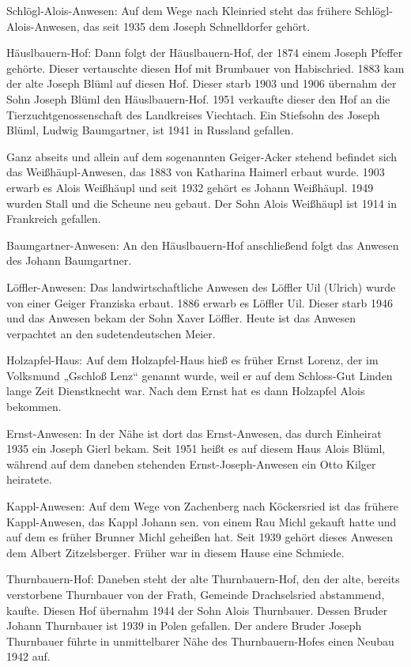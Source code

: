 \documentclass{book}
\begin{document}
Schlögl-Alois-Anwesen: Auf dem Wege nach Kleinried steht das frühere
Schlögl-Alois-Anwesen, das seit 1935 dem Joseph Schnelldorfer gehört.

Häuslbauern-Hof: Dann folgt der Häuslbauern-Hof, der 1874 einem Joseph Pfeffer
gehörte. Dieser vertauschte diesen Hof mit Brumbauer von Habischried. 1883 kam
der alte Joseph Blüml auf diesen Hof. Dieser starb 1903 und 1906 übernahm der
Sohn Joseph Blüml den Häuslbauern-Hof. 1951 verkaufte dieser den Hof an die
Tierzuchtgenossenschaft des Landkreises Viechtach. Ein Stiefsohn des Joseph
Blüml, Ludwig Baumgartner, ist 1941 in Russland gefallen.

Ganz abseits und allein auf dem sogenannten Geiger-Acker stehend befindet sich
das Weißhäupl-Anwesen, das 1883 von Katharina Haimerl erbaut wurde. 1903 erwarb
es Alois Weißhäupl und seit 1932 gehört es Johann Weißhäupl. 1949 wurden Stall
und die Scheune neu gebaut. Der Sohn Alois Weißhäupl ist 1914 in Frankreich
gefallen.

Baumgartner-Anwesen: An den Häuslbauern-Hof anschließend folgt das Anwesen des
Johann Baumgartner.

Löffler-Anwesen: Das landwirtschaftliche Anwesen des Löffler Uil (Ulrich) wurde
von einer Geiger Franziska erbaut. 1886 erwarb es Löffler Uil. Dieser starb 1946
und das Anwesen bekam der Sohn Xaver Löffler. Heute ist das Anwesen verpachtet
an den sudetendeutschen Meier.

Holzapfel-Haus: Auf dem Holzapfel-Haus hieß es früher Ernst Lorenz, der im
Volksmund „Gschloß Lenz“ genannt wurde, weil er auf dem Schloss-Gut Linden lange
Zeit Dienstknecht war. Nach dem Ernst hat es dann Holzapfel Alois bekommen.

Ernst-Anwesen: In der Nähe ist dort das Ernst-Anwesen, das durch Einheirat 1935
ein Joseph Gierl bekam. Seit 1951 heißt es auf diesem Haus Alois Blüml, während
auf dem daneben stehenden Ernst-Joseph-Anwesen ein Otto Kilger heiratete.

Kappl-Anwesen: Auf dem Wege von Zachenberg nach Köckersried ist das frühere
Kappl-Anwesen, das Kappl Johann sen. von einem Rau Michl gekauft hatte und auf
dem es früher Brunner Michl geheißen hat. Seit 1939 gehört dieses Anwesen dem
Albert Zitzelsberger. Früher war in diesem Hause eine Schmiede.

Thurnbauern-Hof: Daneben steht der alte Thurnbauern-Hof, den der alte, bereits
verstorbene Thurnbauer von der Frath, Gemeinde Drachselsried abstammend, kaufte.
Diesen Hof übernahm 1944 der Sohn Alois Thurnbauer. Dessen Bruder Johann
Thurnbauer ist 1939 in Polen gefallen. Der andere Bruder Joseph Thurnbauer
führte in unmittelbarer Nähe des Thurnbauern-Hofes einen Neubau 1942 auf.
\end{document}
